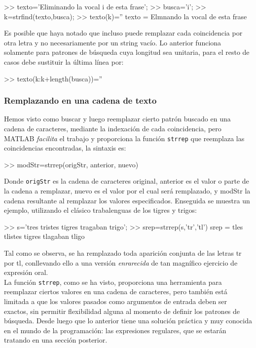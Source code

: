 \begin{matlab}
>> texto='Eliminando la vocal i de esta frase';
>> busca='i';
>> k=strfind(texto,busca);
>> texto(k)='' %
texto =
Elmnando la vocal  de esta frase
\end{matlab}

Es posible que haya notado que incluso puede remplazar cada coincidencia
por otra letra y no necesariamente por un string vacío. Lo anterior
funciona solamente para patrones de búsqueda cuya longitud sea unitaria,
para el resto de casos debe sustituir la última línea por:

\begin{matlab}
>> texto(k:k+length(busca))=''
\end{matlab}

\subsubsection{Remplazando en una cadena de texto}\label{remplazando-en-una-cadena-de-texto}

Hemos visto como buscar y luego reemplazar cierto patrón buscado en una
cadena de caracteres, mediante la indexación de cada coincidencia, pero
MATLAB \emph{facilita} el trabajo y proporciona la función
\texttt{strrep} que reemplaza las coincidencias encontradas, la sintaxis
es:

\begin{matlab}
>> modStr=strrep(origStr,  anterior, nuevo)
\end{matlab}

Donde \texttt{origStr} es la cadena de caracteres original, anterior es el valor
o parte de la cadena a remplazar, nuevo es el valor por el cual será
remplazado, y modStr la cadena resultante al remplazar los valores
especificados. Enseguida se muestra un ejemplo, utilizando el clásico
trabalenguas de los tigres y trigos:

\begin{matlab}
>> s='tres tristes tigres tragaban trigo';
>> srep=strrep(s,'tr','tl')
srep =
tles tlistes tigres tlagaban tligo
\end{matlab}

Tal como se observa, se ha remplazado toda aparición conjunta de las
letras tr por tl, conllevando ello a una versión \emph{enrarecida} de
tan magnífico ejercicio de expresión oral. \\

La función \texttt{strrep}, como se ha visto, proporciona una
herramienta para reemplazar ciertos valores en una cadena de caracteres,
pero también está limitada a que los valores pasados como argumentos de
entrada deben ser exactos, sin permitir flexibilidad alguna al momento
de definir los patrones de búsqueda. Desde luego que lo anterior tiene
una solución práctica y muy conocida en el mundo de la programación: las
expresiones regulares, que se estarán tratando en una sección posterior.

